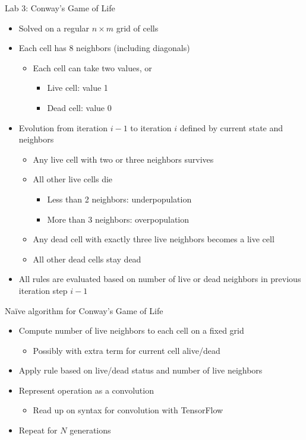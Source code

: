 \begin{frame}{Lab 3: Conway's Game of Life}

  \begin{itemize}
  \item Solved on a regular $n \times m$ grid of cells
  \item Each cell has 8 neighbors (including diagonals)
    \begin{itemize}
    \item Each cell can take two values,  or 
      \begin{itemize}
      \item Live cell: value 1
      \item Dead cell: value 0
      \end{itemize}
    \end{itemize}
  \item Evolution from iteration $i-1$ to iteration $i$ defined by current state and neighbors
    \begin{itemize}
    \item Any live cell with two or three neighbors survives
    \item All other live cells die
      \begin{itemize}
      \item Less than 2 neighbors: underpopulation
      \item More than 3 neighbors: overpopulation
      \end{itemize}
    \item Any dead cell with exactly three live neighbors becomes a live cell
    \item All other dead cells stay dead
    \end{itemize}
  \item All rules are evaluated based on number of live or dead neighbors in
    previous iteration step $i-1$
  \end{itemize}
\end{frame}

\begin{frame}{Na\"ive algorithm for Conway's Game of Life}

  \begin{itemize}
  \item Compute number of live neighbors to each cell on a fixed grid
    \begin{itemize}
    \item Possibly with extra term for current cell alive/dead
    \end{itemize}
  \item Apply rule based on live/dead status and number of live neighbors

  \item Represent operation as a convolution
    \begin{itemize}
    \item Read up on syntax for convolution with TensorFlow
    \end{itemize}
  \item Repeat for $N$ generations
  \end{itemize}

\end{frame}

